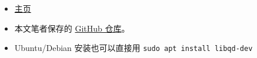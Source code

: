 
\begin{issues}
\issueDraft
\end{issues}

\begin{itemize}
\item \href{https://www.davidhbailey.com/dhbsoftware/}{主页}
\item 本文笔者保存的 \href{https://github.com/MacroUniverse/QD-test}{GitHub 仓库}。
\item Ubuntu/Debian 安装也可以直接用 \verb`sudo apt install libqd-dev`
\end{itemize}
